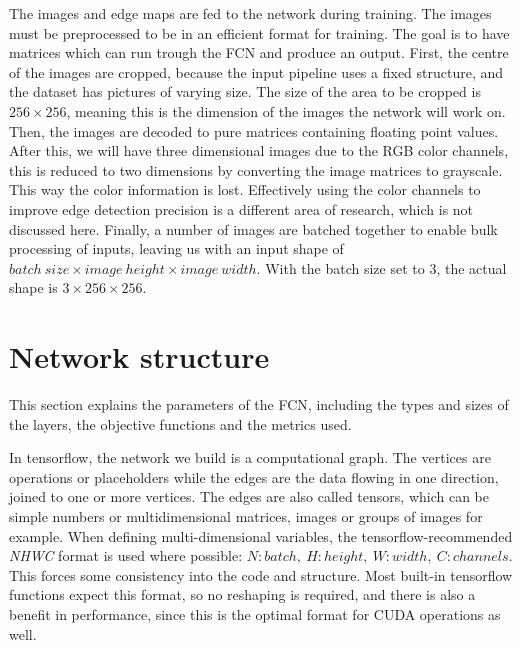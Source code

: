 \documentclass[12pt]{report}
\begin{document}
The images and edge maps are fed to the network during training. The images must be preprocessed to be in an efficient format for training. The goal is to have matrices which can run trough the FCN and produce an output. First, the centre of the images are cropped, because the input pipeline uses a fixed structure, and the dataset has pictures of varying size. The size of the area to be cropped is $256\times256$, meaning this is the dimension of the images the network will work on. Then, the images are decoded to pure matrices containing floating point values. After this, we will have three dimensional images due to the RGB color channels, this is reduced to two dimensions by converting the image matrices to grayscale. This way the color information is lost. Effectively using the color channels to improve edge detection precision is a different area of research, which is not discussed here. Finally, a number of images are batched together to enable bulk processing of inputs, leaving us with an input shape of $ batch\ size\times image\ height\times image\ width $. With the batch size set to $3$, the actual shape is $ 3\times 256\times 256 $.
\section{Network structure}
This section explains the parameters of the FCN, including the types and sizes of the layers, the objective functions and the metrics used.

In tensorflow, the network we build is a computational graph. The vertices are operations or placeholders while the edges are the data flowing in one direction, joined to one or more vertices. The edges are also called tensors, which can be simple numbers or multidimensional matrices, images or groups of images for example.
When defining multi-dimensional variables, the tensorflow-recommended \textit{NHWC} format is used where possible: $ N:batch,\ H:height,\ W:width,\ C:channels. $ This forces some consistency into the code and structure. Most built-in tensorflow functions expect this format, so no reshaping is required, and there is also a benefit in performance, since this is the optimal format for CUDA operations as well.
\end{document}
